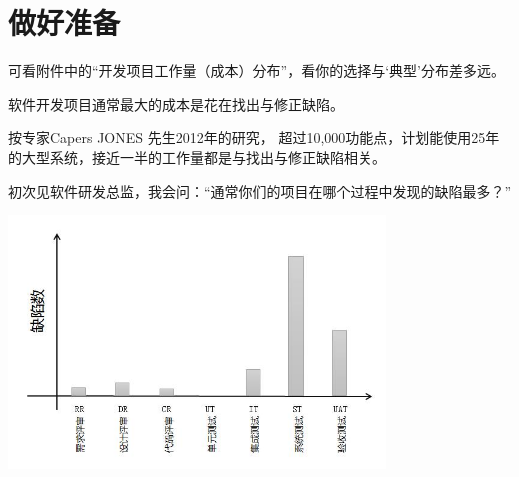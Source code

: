\chapter{做好准备} %


可看附件中的``开发项目工作量（成本）分布''，看你的选择与`典型'分布差多远。

软件开发项目通常最大的成本是花在找出与修正缺陷。

按专家Capers JONES 先生2012年的研究，
超过10,000功能点，计划能使用25年的大型系统，接近一半的工作量都是与找出与修正缺陷相关。

\begin{description}
\item[]
\begin{description}
\tightlist
\item[]
= = =
\end{description}
\end{description}

初次见软件研发总监，我会问：``通常你们的项目在哪个过程中发现的缺陷最多？''

\begin{description}
\item[]
\end{description}


\includegraphics[width=10cm]{AR1缺陷数.jpg}

